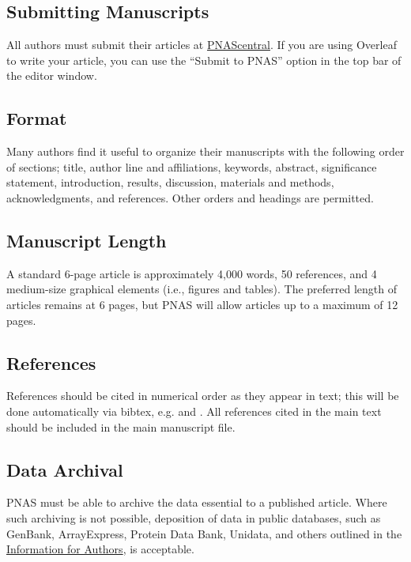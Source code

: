 \documentclass[9pt,twocolumn,twoside,lineno]{pnas-new}
\begin{document}
\subsection*{Submitting Manuscripts}

All authors must submit their articles at \href{http://www.pnascentral.org/cgi-bin/main.plex}{PNAScentral}. If you are using Overleaf to write your article, you can use the ``Submit to PNAS'' option in the top bar of the editor window.

\subsection*{Format}

Many authors find it useful to organize their manuscripts with the following order of sections;  title, author line and affiliations, keywords, abstract, significance statement, introduction, results, discussion, materials and methods, acknowledgments, and references. Other orders and headings are permitted.

\subsection*{Manuscript Length}

A standard 6-page article is approximately 4,000 words, 50 references, and 4 medium-size graphical elements (i.e., figures and tables). The preferred length of articles remains at 6 pages, but PNAS will allow articles up to a maximum of 12 pages.

\subsection*{References}

References should be cited in numerical order as they appear in text; this will be done automatically via bibtex, e.g. \cite{belkin2002using} and \cite{berard1994embedding,coifman2005geometric}. All references cited in the main text should be included in the main manuscript file.

\subsection*{Data Archival}

PNAS must be able to archive the data essential to a published article. Where such archiving is not possible, deposition of data in public databases, such as GenBank, ArrayExpress, Protein Data Bank, Unidata, and others outlined in the \href{https://www.pnas.org/page/authors/journal-policies#xi}{Information for Authors}, is acceptable.
\end{document}

